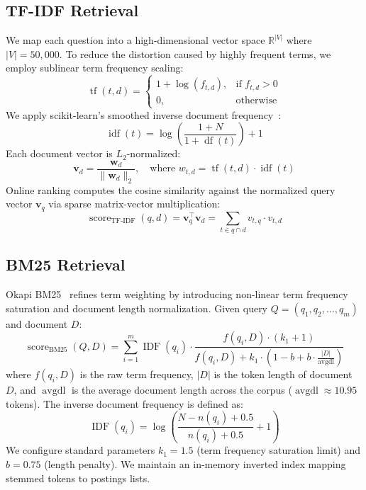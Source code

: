 \documentclass[11pt,a4paper]{article}
\begin{document}
\subsection{TF-IDF Retrieval}
We map each question into a high-dimensional vector space $\mathbb{R}^{|V|}$ where $|V| = 50,000$. To reduce the distortion caused by highly frequent terms, we employ sublinear term frequency scaling:
\begin{equation}
\operatorname{tf}(t, d) = \begin{cases} 
1 + \log(f_{t, d}), & \text{if } f_{t, d} > 0 \\ 
0, & \text{otherwise} 
\end{cases}
\end{equation}
We apply scikit-learn's smoothed inverse document frequency~\cite{pedregosa2011scikit}:
\begin{equation}
\operatorname{idf}(t) = \log\left(\frac{1 + N}{1 + \operatorname{df}(t)}\right) + 1
\end{equation}
Each document vector is $L_2$-normalized:
\begin{equation}
\mathbf{v}_d = \frac{\mathbf{w}_d}{\|\mathbf{w}_d\|_2}, \quad \text{where } w_{t, d} = \operatorname{tf}(t, d) \cdot \operatorname{idf}(t)
\end{equation}
Online ranking computes the cosine similarity against the normalized query vector $\mathbf{v}_q$ via sparse matrix-vector multiplication:
\begin{equation}
\operatorname{score}_{\text{TF-IDF}}(q, d) = \mathbf{v}_q^\top \mathbf{v}_d = \sum_{t \in q \cap d} v_{t, q} \cdot v_{t, d}
\end{equation}

\subsection{BM25 Retrieval}
Okapi BM25~\cite{robertson2009probabilistic} refines term weighting by introducing non-linear term frequency saturation and document length normalization. Given query $Q = (q_1, q_2, \dots, q_m)$ and document $D$:
\begin{equation}
\operatorname{score}_{\text{BM25}}(Q, D) = \sum_{i=1}^{m} \operatorname{IDF}(q_i) \cdot \frac{f(q_i, D) \cdot (k_1 + 1)}{f(q_i, D) + k_1 \cdot \left(1 - b + b \cdot \frac{|D|}{\operatorname{avgdl}}\right)}
\end{equation}
where $f(q_i, D)$ is the raw term frequency, $|D|$ is the token length of document $D$, and $\operatorname{avgdl}$ is the average document length across the corpus ($\operatorname{avgdl} \approx 10.95$ tokens). The inverse document frequency is defined as:
\begin{equation}
\operatorname{IDF}(q_i) = \log\left(\frac{N - n(q_i) + 0.5}{n(q_i) + 0.5} + 1\right)
\end{equation}
We configure standard parameters $k_1 = 1.5$ (term frequency saturation limit) and $b = 0.75$ (length penalty). We maintain an in-memory inverted index mapping stemmed tokens to postings lists.
\end{document}
